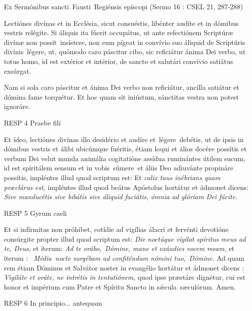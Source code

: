 \documentclass[options]{article}
\begin{document}
	Ex Sermónibus sancti Fausti Regiénsis epíscopi 
	(Sermo 16 : CSEL 21, 287-288)
	
	Lectiónes divínas et in Ecclésia, sicut consuéstis, libénter audíte et in dómibus vestris relégite. 
	Si áliquis ita fúerit occupátus, ut ante refectiónem Scriptúræ divínæ non possit insístere, non eum pígeat in convívio suo áliquid de Scriptúris divínis légere, ut, quómodo caro páscitur cibo, sic reficiátur ánima Dei verbo, ut totus homo, id est extérior et intérior, de sancto et salutári convívio satiátus exsúrgat.
	
	Nam si sola caro páscitur et ánima Dei verbo non reficiátur, ancílla satiátur et dómina fame torquétur. Et hoc quam sit iniústum, sánctitas vestra non potest ignoráre.
	
	RESP 4 Praebe fili
		
	Et ídeo, lectiónes divínas illo desidério et audíre et légere debétis, ut de ipsis in dómibus vestris et álibi ubicúmque fuéritis, étiam loqui et álios docére possítis et verbum Dei velut munda animália cogitatióne assídua ruminántes útilem sucum, id est spiritálem sensum et in vobis súmere et áliis Deo adiuvánte propináre possítis, impléntes illud quod scriptum est: Et
	\textit{calix tuus inébrians quam præclárus est,}
	impléntes illud quod beátus Apóstolus hortátur et ádmonet dicens: 
	\textit{Sive manducétis sive bibátis sive áliquid faciátis, ómnia ad glóriam Dei fácite.}

	
RESP 5	Gyrum caeli

	
	Et si infírmitas non próhibet, cotídie ad vigílias álacri et fervénti devotióne consúrgite propter illud quod scriptum est: 
	\textit{Die noctúque vígilat spíritus meus ad te, Deus,}
et íterum: 
\textit{Ad te orábo, Dómine, mane et exáudies vocem meam,}
et íterum : 
\textit{Média nocte surgébam ad confiténdum nómini tuo, Dómine.}
Ad quam rem étiam Dóminus et Salvátor noster in evangélio hortátur et ádmonet dicens : 
\textit{Vigiláte et oráte, ne intrétis in tentatiónem,}
quod ipse præstáre dignétur, cui est honor et impérium cum Patre et Spíritu Sancto in s\'{æ}cula sæculórum. Amen.
	
RESP 6 In principio... antequam
\end{document}
